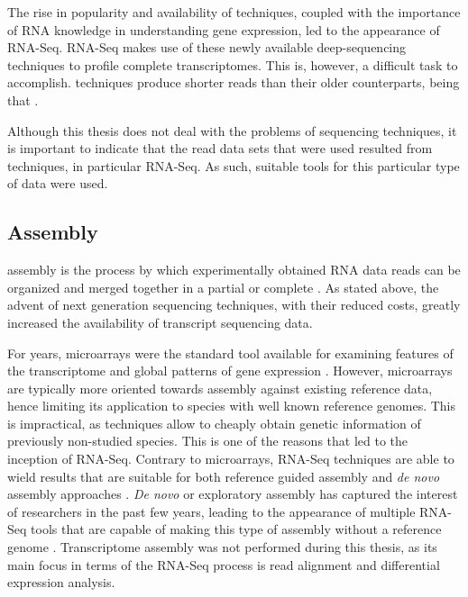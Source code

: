 The rise in popularity and availability of \ngs{} techniques, coupled with the
importance of RNA knowledge in understanding gene expression, led to the
appearance of RNA-Seq. RNA-Seq makes use of these newly available
deep-sequencing techniques to profile complete transcriptomes. This is, however,
a difficult task to accomplish. \ngs{} techniques produce shorter reads than
their older counterparts, being that 
\cite[p. 671]{Martin2011}.

Although this thesis does not deal with the problems of sequencing techniques, it
is important to indicate that the read data sets that were used resulted from
\ngs{} techniques, in particular RNA-Seq. As such, suitable tools for this
particular type of data were used.

\subsection{\Trans{} Assembly}\label{sec:transassembly}

\Trans{} assembly is the process by which experimentally obtained RNA data reads
can be organized and merged together in a partial or complete \trans. As stated
above, the advent of next generation sequencing techniques, with their reduced
costs, greatly increased the availability of transcript sequencing data.

For years, microarrays were the standard tool available for examining features
of the transcriptome and global patterns of gene expression \cite{Wolf2013}.
However, microarrays are typically more oriented towards assembly against
existing reference data, hence limiting its application to species with well
known reference genomes. This is impractical, as \ngs{} techniques allow to
cheaply obtain genetic information of previously non-studied species. This is
one of the reasons that led to the inception of RNA-Seq. Contrary to
microarrays, RNA-Seq techniques are able to wield results that are suitable for
both reference guided assembly and \textit{de novo} assembly approaches
\cite{Wilhelm2009}. \textit{De novo} or exploratory assembly has captured the
interest of researchers in the past few years, leading to the appearance of
multiple RNA-Seq tools that are capable of making this type of assembly without
a reference genome \cite{nuno11:assemblathon}. Transcriptome assembly was not
performed during this thesis, as its main focus in terms of the RNA-Seq process
is read alignment and differential expression analysis.

